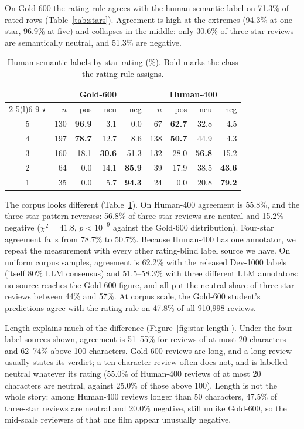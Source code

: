 On Gold-600 the rating rule agrees with the human semantic label on
71.3\% of rated rows (Table~\ref{tab:stars}). Agreement is high at
the extremes (94.3\% at one star, 96.9\% at five) and collapses in
the middle: only 30.6\% of three-star reviews are semantically
neutral, and 51.3\% are negative.

\begin{table}[t]
\centering
\small
\setlength{\tabcolsep}{3.5pt}
\begin{tabular}{@{}crrrrrrrr@{}}
\toprule
 & \multicolumn{4}{c}{Gold-600} & \multicolumn{4}{c}{Human-400} \\
\cmidrule(lr){2-5}\cmidrule(l){6-9}
$\star$ & $n$ & pos & neu & neg & $n$ & pos & neu & neg \\
\midrule
5 & 130 & \textbf{96.9} & 3.1 & 0.0 & 67 & \textbf{62.7} & 32.8 & 4.5 \\
4 & 197 & \textbf{78.7} & 12.7 & 8.6 & 138 & \textbf{50.7} & 44.9 & 4.3 \\
3 & 160 & 18.1 & \textbf{30.6} & 51.3 & 132 & 28.0 & \textbf{56.8} & 15.2 \\
2 & 64 & 0.0 & 14.1 & \textbf{85.9} & 39 & 17.9 & 38.5 & \textbf{43.6} \\
1 & 35 & 0.0 & 5.7 & \textbf{94.3} & 24 & 0.0 & 20.8 & \textbf{79.2} \\
\bottomrule
\end{tabular}
\caption{Human semantic labels by star rating (\%). Bold marks the
class the rating rule assigns.}
\label{tab:perstar}
\end{table}

The corpus looks different (Table~\ref{tab:perstar}). On Human-400 agreement is 55.8\%, and the
three-star pattern reverses: 56.8\% of three-star reviews are neutral
and 15.2\% negative ($\chi^2{=}41.8$, $p{<}10^{-9}$ against the
Gold-600 distribution). Four-star agreement falls from 78.7\% to
50.7\%. Because Human-400 has one annotator, we repeat the
measurement with every other rating-blind label source we have. On
uniform corpus samples, agreement is 62.2\% with the released
Dev-1000 labels (itself 80\% LLM consensus) and 51.5--58.3\% with
three different LLM annotators; no source reaches
the Gold-600 figure, and all put the neutral share of three-star
reviews between 44\% and 57\%. At corpus scale, the Gold-600
student's predictions agree with the rating rule on 47.8\% of all
910{,}998 reviews.

Length explains much of the difference
(Figure~\ref{fig:star-length}). Under the four label sources shown,
agreement is 51--55\% for reviews of at most 20 characters and
62--74\% above 100 characters. Gold-600 reviews are long, and a long
review usually states its verdict; a ten-character review often does
not, and is labelled neutral whatever its rating (55.0\% of Human-400
reviews of at most 20 characters are neutral, against 25.0\% of those
above 100). Length is not the whole story: among Human-400 reviews
longer than 50 characters, 47.5\% of three-star reviews are neutral
and 20.0\% negative, still unlike Gold-600, so the mid-scale
reviewers of that one film appear unusually negative.

